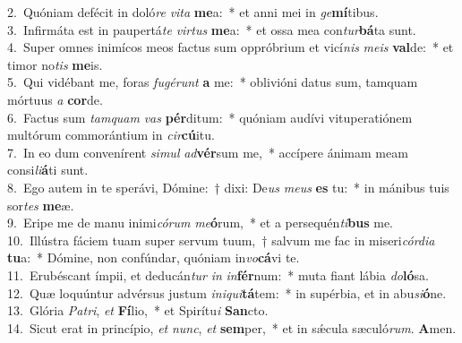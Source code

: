 {2.~}Quóniam defécit in doló\textit{re} \textit{vi}\textit{ta} \textbf{me}a:~* et anni mei in \textit{ge}\textbf{mí}tibus.\\
{3.~}Infirmáta est in paupertá\textit{te} \textit{vir}\textit{tus} \textbf{me}a:~* et ossa mea con\textit{tur}\textbf{bá}ta sunt.\\
{4.~}Super omnes inimícos meos factus sum oppróbrium et vicí\textit{nis} \textit{me}\textit{is} \textbf{val}de:~* et timor no\textit{tis} \textbf{me}is.\\
{5.~}Qui vidébant me, foras \textit{fu}\textit{gé}\textit{runt} \textbf{a} me:~* oblivióni datus sum, tamquam mórtuus \textit{a} \textbf{cor}de.\\
{6.~}Factus sum \textit{tam}\textit{quam} \textit{vas} \textbf{pér}ditum:~* quóniam audívi vituperatiónem multórum commorántium in \textit{cir}\textbf{cú}itu.\\
{7.~}In eo dum convenírent \textit{si}\textit{mul} \textit{ad}\textbf{vér}sum me,~* accípere ánimam meam consi\textit{li}\textbf{á}ti sunt.\\
{8.~}Ego autem in te sperávi, Dómine:~† dixi: De\textit{us} \textit{me}\textit{us} \textbf{es} tu:~* in mánibus tuis sor\textit{tes} \textbf{me}æ.\\
{9.~}Eripe me de manu inimi\textit{có}\textit{rum} \textit{me}\textbf{ó}rum,~* et a persequén\textit{ti}\textbf{bus} me.\\
{10.~}Illústra fáciem tuam super servum tuum,~† salvum me fac in miseri\textit{cór}\textit{di}\textit{a} \textbf{tu}a:~* Dómine, non confúndar, quóniam in\textit{vo}\textbf{cá}vi te.\\
{11.~}Erubéscant ímpii, et deducán\textit{tur} \textit{in} \textit{in}\textbf{fér}num:~* muta fiant lábia \textit{do}\textbf{ló}sa.\\
{12.~}Quæ loquúntur advérsus justum \textit{i}\textit{ni}\textit{qui}\textbf{tá}tem:~* in supérbia, et in abu\textit{si}\textbf{ó}ne.\\
{13.~}Glória \textit{Pa}\textit{tri}, \textit{et} \textbf{Fí}lio,~* et Spirítu\textit{i} \textbf{San}cto.\\
{14.~}Sicut erat in princípio, \textit{et} \textit{nunc}, \textit{et} \textbf{sem}per,~* et in sǽcula sæculó\textit{rum}. \textbf{A}men.\\
